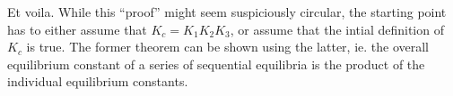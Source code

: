 			Et voila. While this \enquote{proof} might seem suspiciously circular, the starting point has to either assume that
			$K_{c} = K_{1}K_{2}K_{3}$, or assume that the intial definition of $K_{c}$ is true. The former theorem can be shown using
			the latter, ie. the overall equilibrium constant of a series of sequential equilibria is the product of the individual equilibrium
			constants.






































